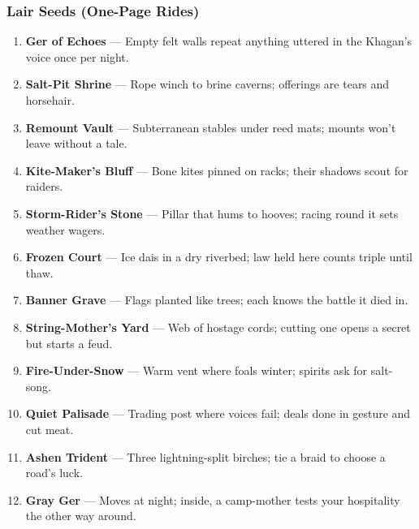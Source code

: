 \subsubsection{Lair Seeds (One-Page Rides)}
\label{sec:ykrul-lair-seeds}
\begin{enumerate}
  \item \textbf{Ger of Echoes} --- Empty felt walls repeat anything uttered in the Khagan's voice once per night.
  \item \textbf{Salt-Pit Shrine} --- Rope winch to brine caverns; offerings are tears and horsehair.
  \item \textbf{Remount Vault} --- Subterranean stables under reed mats; mounts won't leave without a tale.
  \item \textbf{Kite-Maker's Bluff} --- Bone kites pinned on racks; their shadows scout for raiders.
  \item \textbf{Storm-Rider's Stone} --- Pillar that hums to hooves; racing round it sets weather wagers.
  \item \textbf{Frozen Court} --- Ice dais in a dry riverbed; law held here counts triple until thaw.
  \item \textbf{Banner Grave} --- Flags planted like trees; each knows the battle it died in.
  \item \textbf{String-Mother's Yard} --- Web of hostage cords; cutting one opens a secret but starts a feud.
  \item \textbf{Fire-Under-Snow} --- Warm vent where foals winter; spirits ask for salt-song.
  \item \textbf{Quiet Palisade} --- Trading post where voices fail; deals done in gesture and cut meat.
  \item \textbf{Ashen Trident} --- Three lightning-split birches; tie a braid to choose a road's luck.
  \item \textbf{Gray Ger} --- Moves at night; inside, a camp-mother tests your hospitality the other way around.
\end{enumerate}

